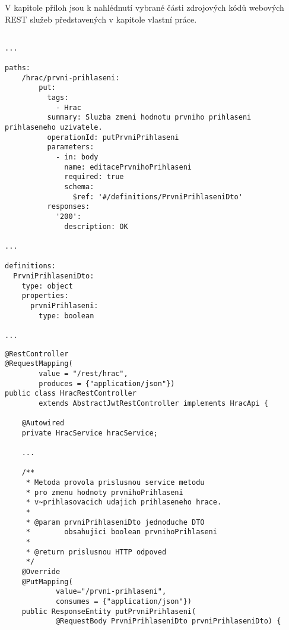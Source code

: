 \documentclass[12pt]{article}
\begin{document}
{\begin{literatura}




    

\end{literatura}


V kapitole příloh jsou k nahlédnutí vybrané části zdrojových kódů
webových REST služeb představených v kapitole vlastní práce.


\begin{lstlisting}

...

paths:
    /hrac/prvni-prihlaseni:
        put:
          tags:
            - Hrac
          summary: Sluzba zmeni hodnotu prvniho prihlaseni prihlaseneho uzivatele.
          operationId: putPrvniPrihlaseni
          parameters:
            - in: body
              name: editacePrvnihoPrihlaseni
              required: true
              schema:
                $ref: '#/definitions/PrvniPrihlaseniDto'
          responses:
            '200':
              description: OK
              
...

definitions:
  PrvniPrihlaseniDto:
    type: object
    properties:
      prvniPrihlaseni:
        type: boolean

...

\end{lstlisting}


\begin{lstlisting}
@RestController
@RequestMapping(
        value = "/rest/hrac",
        produces = {"application/json"})
public class HracRestController 
        extends AbstractJwtRestController implements HracApi {
    
    @Autowired
    private HracService hracService;
    
    ...
    
    /**
     * Metoda provola prislusnou service metodu
     * pro zmenu hodnoty prvnihoPrihlaseni
     * v~prihlasovacich udajich prihlaseneho hrace.
     *
     * @param prvniPrihlaseniDto jednoduche DTO 
     *        obsahujici boolean prvnihoPrihlaseni
     *                           
     * @return prislusnou HTTP odpoved
     */
    @Override
    @PutMapping(
            value="/prvni-prihlaseni",
            consumes = {"application/json"})
    public ResponseEntity putPrvniPrihlaseni(
            @RequestBody PrvniPrihlaseniDto prvniPrihlaseniDto) {


\end{lstlisting}}
\end{document}
